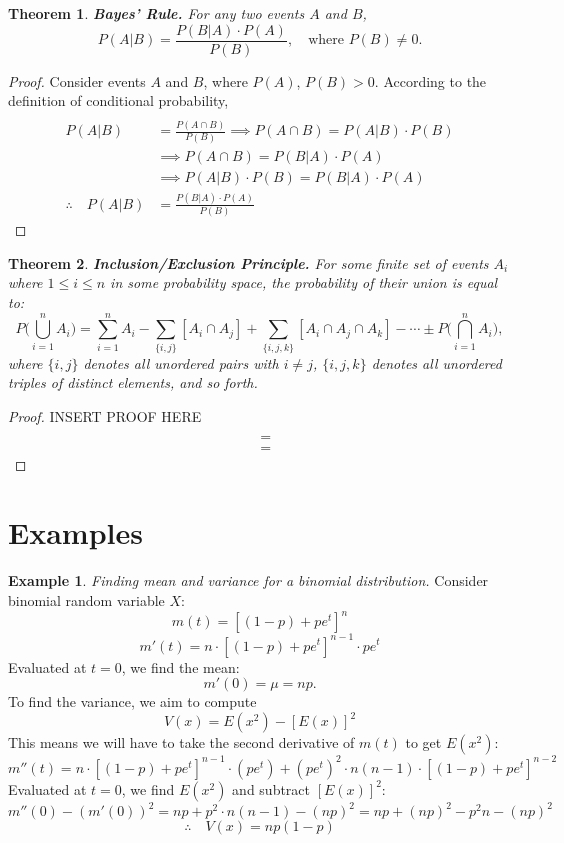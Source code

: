 \documentclass[a4paper]{article}
\newtheorem{thm}{Theorem}
\theoremstyle{definition}
\newtheorem{exmp}{Example}[section]
\begin{document}
\begin{thm} \textbf{Bayes' Rule.} For any two events $A$ and $B$, 
$$P(A|B) = \frac{P(B|A)\cdot P(A)}{P(B)}, \quad \text{where } P(B) \neq 0.$$ 
\end{thm}
\begin{proof} Consider events $A$ and $B$, where $P(A)$, $P(B) > 0$. According to the definition of conditional probability, 
\begin{align*} 
\\P(A|B) &= \frac{P(A \cap B)}{P(B)} \implies P(A\cap B) = P(A|B)\cdot P(B)
\\{}&\implies P(A\cap B) = P(B|A) \cdot P(A)
\\{}&\implies P(A|B)\cdot P(B) = P(B|A) \cdot P(A)
\\ \therefore \quad P(A|B) &= \frac{P(B|A)\cdot P(A)}{P(B)} 
\end{align*}
\end{proof}
\begin{thm} \textbf{Inclusion/Exclusion Principle.} For some finite set of events $A_i$ where $1 \leq i \leq n$ in some probability space, the probability of their union is equal to: 
$$P\bigg(\bigcup_{i=1}^n A_i \bigg) = \sum_{i=1}^n A_i - \sum_{\{i,j\}} [A_i \cap A_j] + \sum_{\{i,j,k\}} [A_i \cap A_j \cap A_k] - \cdots \pm P\bigg(\bigcap_{i=1}^n A_i \bigg),$$
where $\{i, j\}$ denotes all unordered pairs with $i \neq j$, $\{i, j, k\}$ denotes all unordered triples of distinct elements, and so forth.
\end{thm}
\begin{proof} INSERT PROOF HERE
\begin{align*} 
\\ {} &= {}
\\ {} &= {}
\end{align*}
\end{proof}
\section{Examples}
\begin{exmp}
\textit{Finding mean and variance for a binomial distribution.}
\bigbreak Consider binomial random variable $X$:
$$m(t)=[(1-p)+pe^t]^n$$
$$m'(t)=n\cdot[(1-p)+pe^t]^{n-1}\cdot pe^t$$
\quad \: Evaluated at $t=0$, we find the mean:
$$m'(0)=\mu = np.$$
\quad \: To find the variance, we aim to compute 
$$V(x) = E(x^2)-[E(x)]^2$$
\quad \: This means we will have to take the second derivative of $m(t)$ to get $E(x^2)$:
$$m''(t)=n\cdot[(1-p)+pe^t]^{n-1}\cdot (pe^t)+(pe^t)^2\cdot n(n-1)\cdot[(1-p)+pe^t]^{n-2}$$
\quad \: Evaluated at $t=0$, we find $E(x^2)$ and subtract $[E(x)]^2$: 
$$m''(0) - (m'(0))^2 = np+p^2\cdot n(n-1)-(np)^2=np+(np)^2-p^2n-(np)^2$$
$$\therefore \quad V(x) = np(1-p)$$
\end{exmp}
\end{document}
